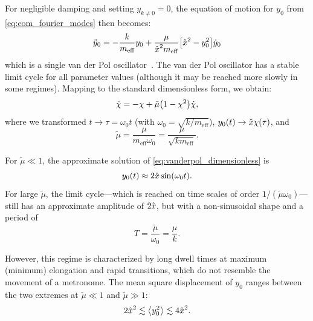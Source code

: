 \documentclass[10pt,aps,pra,twocolumn,nofootinbib,superscriptaddress,floatfix]{revtex4-2}
\let\orghat\hat
\def\hat#1{\orghat{\kern0pt #1}}
\begin{document}
For negligible damping and setting \(y_{k\neq0}=0\), the equation of motion for \(y_{0}\) from \cref{eq:eom_fourier_modes} then becomes:
\begin{equation}
  \label{eq:vanderpol_y0}
  \ddot{y}_{0} = -\frac{k}{m_{\text{eff}}}y_{0} + \frac{{\mu}}{\hat{x}^{2} m_{\text{eff}}}\bqty{\hat{x}^{2}- y_{0}^{2}}\dot{y}_{0}
\end{equation}
which is a single van der Pol oscillator~\cite{Strogatz2018}.
The van der Pol oscillator has a stable limit cycle for all parameter values (although it may be reached more slowly in some regimes).
Mapping to the standard dimensionless form, we obtain:
\begin{equation}
  \label{eq:vanderpol_dimensionless}
  \ddot{\chi} = -\chi + \tilde{\mu} \pqty{1-\chi^{2}}\dot{\chi},
\end{equation}
where we transformed \(t\to \tau = \omega_{0}t\) (with \(\omega_{0}=\sqrt{ k /m_{\text{eff}}}\)), \(y_{0}(t)\to \hat{x} \chi(\tau)\), and
\begin{equation}
  \label{eq:tilde_mu_def}
  \tilde{\mu} =\frac{\mu}{m_{\text{eff}} \omega_{0}} = \frac{\mu}{\sqrt{km_{\text{eff}}}}.
\end{equation}

For \(\tilde{\mu}\ll1\), the approximate solution of \cref{eq:vanderpol_dimensionless} is~\cite{Strogatz2018}
\begin{equation}
  \label{eq:approx_sol_small_mu}
  y_{0}(t) \approx 2 \hat{x} \sin(\omega_{0}t).
\end{equation}
For large \(\tilde{\mu}\), the limit cycle—which is reached on time scales of order \(1 / (\tilde{\mu} \omega_{0})\)—still has an approximate amplitude of \(2\hat{x}\), but with a non-sinusoidal shape and a period of
\begin{equation}
  \label{eq:limit_cycle_period}
  T = \frac{\tilde{\mu}}{\omega_{0}} = \frac{\mu}{k}.
\end{equation}

However, this regime is characterized by long dwell times at maximum (minimum) elongation and rapid transitions, which do not resemble the movement of a metronome.
The mean square displacement of \(y_{0}\) ranges between the two extremes at \(\tilde{\mu} \ll 1\) and \(\tilde{\mu} \gg 1\):
\begin{equation}
  \label{eq:msd_bounds}
  2\hat{x}^{2}\lesssim \ev{y_{0}^{2}} \lesssim 4\hat{x}^{2}.
\end{equation}
\end{document}
